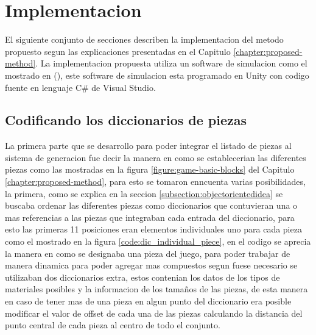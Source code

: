 \chapter{Implementacion}
\label{chapter:implementation}

El siguiente conjunto de secciones describen la implementacion del metodo
propuesto segun las explicaciones presentadas en el Capitulo
\ref{chapter:proposed-method}. La implementacion propuesta utiliza un software
de simulacion como el mostrado en \cite{} (\url{}), este software de simulacion esta
programado en Unity con codigo fuente en lenguaje C\# de Visual Studio.

\section{Codificando los diccionarios de piezas}
\label{section:piece_dictionary}

La primera parte que se desarrollo para poder integrar el listado de piezas al
sistema de generacion fue decir la manera en como se establecerian las
diferentes piezas como las mostradas en la figura \ref{figure:game-basic-blocks}
del Capitulo \ref{chapter:proposed-method}, para esto se tomaron enncuenta
varias posibilidades, la primera, como se explica en la seccion
\ref{subsection:objectorientedidea} se buscaba ordenar las diferentes piezas
como diccionarios que contuvieran una o mas referencias a las piezas que
integraban cada entrada del diccionario, para esto las primeras 11 posiciones
eran elementos individuales uno para cada pieza como el mostrado en la figura
\ref{code:dic_individual_piece}, en el codigo se aprecia la manera en como se
designaba una pieza del juego, para poder trabajar de manera dinamica para poder
agregar mas compuestos segun fuese necesario se utilizaban dos diccionarios
extra, estos contenian los datos de los tipos de materiales posibles y la
informacion de los tamaños de las piezas, de esta manera en caso de tener mas de
una pieza en algun punto del diccionario era posible modificar el valor de
offset de cada una de las piezas calculando la distancia del punto central de
cada pieza al centro de todo el conjunto.


